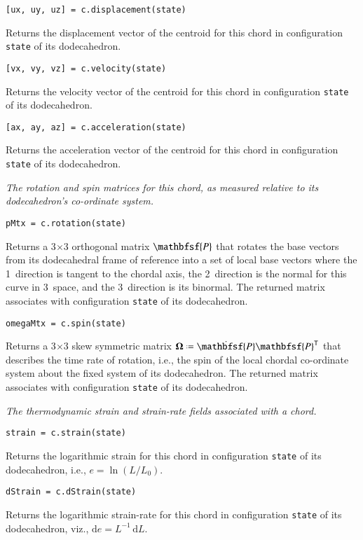 \medskip\noindent
\texttt{[ux, uy, uz] = c.displacement(state)}

\medskip\noindent
Returns the displacement vector of the centroid for this chord in configuration \texttt{state} of its dodecahedron.

\medskip\noindent
\texttt{[vx, vy, vz] = c.velocity(state)}

\medskip\noindent
Returns the velocity vector of the centroid for this chord in configuration \texttt{state} of its dodecahedron.

\medskip\noindent
\texttt{[ax, ay, az] = c.acceleration(state)}

\medskip\noindent
Returns the acceleration vector of the centroid for this chord in configuration \texttt{state} of its dodecahedron.

\medskip\noindent
\textit{The rotation and spin matrices for this chord, as measured relative to its dodecahedron's co-ordinate system.}

\medskip\noindent
\texttt{pMtx = c.rotation(state)}

\medskip\noindent
Returns a 3$\times$3 orthogonal matrix $\mathbfsf{P}$ that rotates the base vectors from its dodecahedral frame of reference into a set of local base vectors where the 1~direction is tangent to the chordal axis, the 2~direction is the normal for this curve in 3~space, and the 3~direction is its binormal.  The returned matrix associates with configuration \texttt{state} of its dodecahedron.

\medskip\noindent
\texttt{omegaMtx = c.spin(state)}

\medskip\noindent
Returns a 3$\times$3 skew symmetric matrix $\boldsymbol{\Omega} \defeq \dot{\mathbfsf{P}} \mathbfsf{P}^{\mathsf{T}}$ that describes the time rate of
rotation, i.e., the spin of the local chordal co-ordinate system about the
fixed   system of its dodecahedron.  The returned matrix
associates with configuration \texttt{state} of its dodecahedron.

\medskip\noindent
\textit{The thermodynamic strain and strain-rate fields associated with a chord.}

\medskip\noindent
\texttt{strain = c.strain(state)}

\medskip\noindent
Returns the logarithmic strain for this chord in configuration \texttt{state} of its dodecahedron, i.e., $e = \ln (L / L_0)$.

\medskip\noindent
\texttt{dStrain = c.dStrain(state)}

\medskip\noindent
Returns the logarithmic strain-rate for this chord in configuration \texttt{state} of its dodecahedron, viz., $\mathrm{d} e = L^{-1} \, \mathrm{d}L$.
